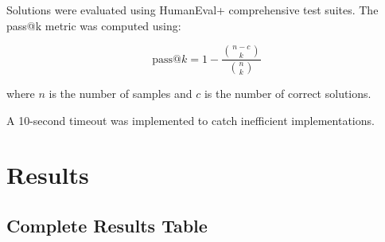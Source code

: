 \documentclass[11pt]{article}
\begin{document}
Solutions were evaluated using HumanEval+ comprehensive test suites. The pass@k metric was computed using:

\[ \text{pass}@k = 1 - \frac{\binom{n-c}{k}}{\binom{n}{k}} \]

where $n$ is the number of samples and $c$ is the number of correct solutions.

A 10-second timeout was implemented to catch inefficient implementations.

\section{Results}

\subsection{Complete Results Table}
\end{document}
